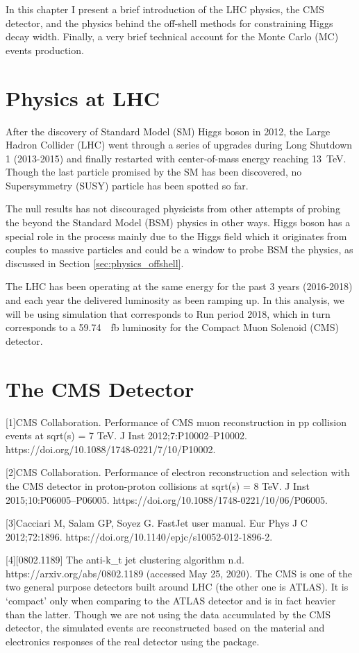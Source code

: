 In this chapter I present a brief introduction of the
LHC physics, the CMS detector, and the physics behind the off-shell methods
for constraining Higgs decay width. Finally, a very brief technical account for
the Monte Carlo (MC) events production.

\section{Physics at LHC}
After the discovery of Standard Model (SM) Higgs boson in 2012, the Large Hadron Collider (LHC)
went through a series of upgrades during Long Shutdown 1 (2013-2015) and finally restarted with center-of-mass energy reaching
\SI{13}{\tera\electronvolt}. Though the last particle promised by the SM has been discovered,
no Supersymmetry (SUSY) particle has been spotted so far.

The null results has not discouraged physicists from other attempts of probing the 
beyond the Standard Model (BSM) physics in other ways. Higgs boson has a special role in
the process mainly due to the Higgs field which it originates from couples to massive particles
and could be a window to probe BSM the physics, as discussed in Section \ref{sec:physics_offshell}.

The LHC has been operating at the same energy for the past 3 years (2016-2018) and each year
the delivered luminosity as been ramping up.\cite{xampl} In this analysis, we will be using
simulation that corresponds to Run period 2018, which in turn corresponds to a 
\SI{59.74}{\per\femto\barn} luminosity for the Compact Muon Solenoid (CMS) detector.\cite{xampl}

\section{The CMS Detector}
[1]CMS Collaboration. Performance of CMS muon reconstruction in pp collision events at sqrt(s) = 7 TeV. J Inst 2012;7:P10002–P10002. https://doi.org/10.1088/1748-0221/7/10/P10002.

[2]CMS Collaboration. Performance of electron reconstruction and selection with the CMS detector in proton-proton collisions at sqrt(s) = 8 TeV. J Inst 2015;10:P06005–P06005. https://doi.org/10.1088/1748-0221/10/06/P06005.

[3]Cacciari M, Salam GP, Soyez G. FastJet user manual. Eur Phys J C 2012;72:1896. https://doi.org/10.1140/epjc/s10052-012-1896-2.

[4][0802.1189] The anti-k\_t jet clustering algorithm n.d. https://arxiv.org/abs/0802.1189 (accessed May 25, 2020).
The CMS is one of the two general purpose detectors built around LHC (the other one is ATLAS). It
is `compact' only when comparing to the ATLAS detector and is in fact heavier than the latter.
Though we are not using the data accumulated by the CMS detector, the simulated events are
reconstructed based on the material and electronics responses of the real detector using the
\gf package.\cite{geant4}

